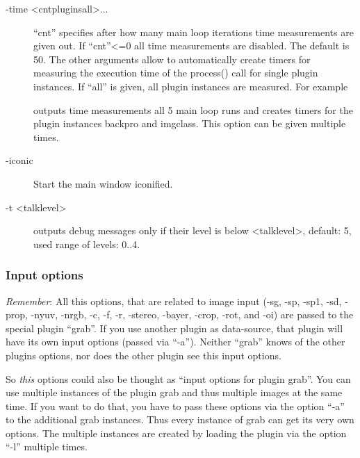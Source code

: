 \begin{description}
\item[-time \textless{}cnt\textbar{}plugins\textbar{}all\textgreater{}...]
  ``cnt'' specifies after how many main loop iterations time
  measurements are given out. If ``cnt''\textless{}=0 all time
  measurements are disabled. The default is 50. The other arguments
  allow to automatically create timers for measuring the execution
  time of the process() call for single plugin instances. If ``all''
  is given, all plugin instances are measured. For example

  \sE
  outputs time measurements all 5 main loop runs and creates timers
  for the plugin instances backpro and imgclass. This option can be
  given multiple times.

\item[-iconic]
  Start the main \icewing{} window iconified.

\item[-t \textless{}talklevel\textgreater{}]
  \label{page:opt_t_talk}
  \icewing{} outputs debug messages only if their level is below
  \textless{}talklevel\textgreater{}, default: 5, used range of
  levels: 0..4.

\end{description}

\subsubsection {Input options}

\emph{Remember}: All this options, that are related to image input
(-sg, -sp, -sp1, -sd, -prop, -nyuv, -nrgb, -c, -f, -r, -stereo,
-bayer, -crop, -rot, and -oi) are passed to the special plugin
``grab''. If you use another plugin as data-source, that plugin will
have its own input options (passed via ``-a''). Neither ``grab''
knows of the other plugins options, nor does the other plugin see
this input options.

So {\em this} options could also be thought as ``input options for
plugin grab''. You can use multiple instances of the plugin grab and
thus multiple images at the same time. If you want to do that, you
have to pass these options via the \icewing{} option ``-a'' to the
additional grab instances. Thus every instance of grab can get its
very own options. The multiple instances are created by loading the
plugin via the option ``-l'' multiple times.

